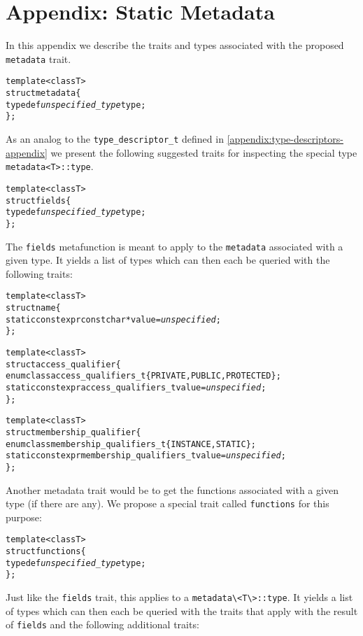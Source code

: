 \section{Appendix: Static Metadata}
\label{appendix:metadata-appendix}
In this appendix we describe the traits and types associated with the proposed \verb+metadata+ trait.

\begin{alltt}
  template <class T>
  struct metadata \{
    typedef \emph{unspecified\_type} type;
  \};
\end{alltt}

As an analog to the \verb+type_descriptor_t+ defined in \autoref{appendix:type-descriptors-appendix} we present the following suggested traits for inspecting the special type \verb+metadata<T>::type+.

\begin{alltt}
  template <class T>
  struct fields \{
    typedef \emph{unspecified\_type} type;
  \};
\end{alltt}

The \verb+fields+ metafunction is meant to apply to the \verb+metadata+ associated with a given type. It yields a list of types which can then each be queried with the following traits:

\begin{alltt}
  template <class T>
  struct name \{
    static constexpr const char* value = \emph{unspecified};
  \};
  
  template <class T>
  struct access\_qualifier \{
    enum class access\_qualifiers\_t \{ PRIVATE, PUBLIC, PROTECTED \};
    static constexpr access_qualifiers\_t value = \emph{unspecified};
  \};
  
  template <class T>
  struct membership\_qualifier \{
    enum class membership\_qualifiers\_t \{ INSTANCE, STATIC \};
    static constexpr membership\_qualifiers\_t value = \emph{unspecified};
  \};
\end{alltt}

Another metadata trait would be to get the functions associated with a given type (if there are any). We propose a special trait called \verb+functions+ for this purpose:

\begin{alltt}
  template <class T>
  struct functions \{
    typedef \emph{unspecified\_type} type;
  \};
\end{alltt}

Just like the \verb+fields+ trait, this applies to a \verb+metadata\<T\>::type+. It yields a list of types which can then each be queried with the traits that apply with the result of \verb+fields+ and the following additional traits:

